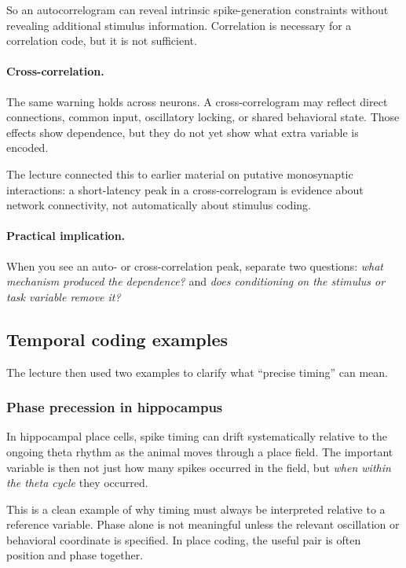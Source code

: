 So an autocorrelogram can reveal intrinsic spike-generation constraints without revealing additional stimulus information. Correlation is necessary for a correlation code, but it is not sufficient.

\paragraph{Cross-correlation.}
The same warning holds across neurons. A cross-correlogram may reflect direct connections, common input, oscillatory locking, or shared behavioral state. Those effects show dependence, but they do not yet show what extra variable is encoded.

The lecture connected this to earlier material on putative monosynaptic interactions: a short-latency peak in a cross-correlogram is evidence about network connectivity, not automatically about stimulus coding.

\paragraph{Practical implication.}
When you see an auto- or cross-correlation peak, separate two questions: \emph{what mechanism produced the dependence?} and \emph{does conditioning on the stimulus or task variable remove it?}

\subsection{Temporal coding examples}

The lecture then used two examples to clarify what ``precise timing'' can mean.

\subsubsection{Phase precession in hippocampus}

In hippocampal place cells, spike timing can drift systematically relative to the ongoing theta rhythm as the animal moves through a place field. The important variable is then not just how many spikes occurred in the field, but \emph{when within the theta cycle} they occurred.

This is a clean example of why timing must always be interpreted relative to a reference variable. Phase alone is not meaningful unless the relevant oscillation or behavioral coordinate is specified. In place coding, the useful pair is often position and phase together.

